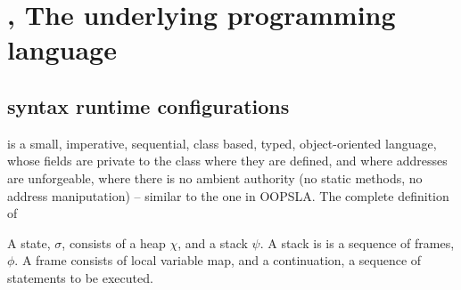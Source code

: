 \section{\LangOO, The underlying programming language } %

\subsection{\LangOO syntax runtime configurations}
\label{sub:Loo} 
 \LangOO  is a {small}, imperative, sequential,  class based, typed, object-oriented language, whose fields are private to the class where they are defined, and where addresses are unforgeable, where there is no ambient authority (no static methods, no address maniputation)  -- similar to the one in OOPSLA.
The complete definition of 

A \LangOO state, $\sigma$,  consists of a  heap $\chi$, and a   stack $\psi$. A stack is is a sequence of frames, $\phi$.
A frame consists of local variable map, and a continuation, \ie a sequence of statements to be executed.

 
